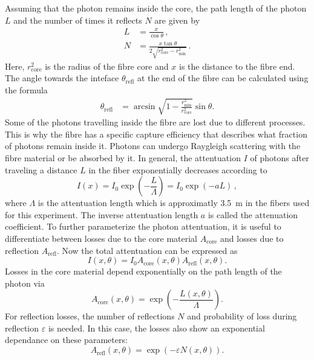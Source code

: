 Assuming that the photon remains inside the core, the path length of the photon $L$ and the number of
times it reflects $N$ are given by
\begin{align}
    L &= \frac{x}{\cos{\theta}} \, , \label{eq:L} \\ 
    N &= \frac{x \tan{\theta}}{2 \sqrt{r_\text{core}^2-r_\text{min}^2}} \, \label{eq:N} .
\end{align}
Here, $r_\text{core}^2$ is the radius of the fibre core and $x$ is the distance to the fibre end.
The angle towards the inteface $\theta_\text{refl}$ at the end of the fibre can be calculated using the formula
\begin{align*}
    \theta_\text{refl} &= \arcsin{\sqrt{1-\frac{r_\text{min}^2}{r_\text{core}^2}} \sin{\theta}} .
\end{align*}
Some of the photons travelling inside the fibre are lost due to different processes. This is why
the fibre has a specific capture efficiency that describes what fraction of photons remain inside it.
Photons can undergo Raygleigh scattering with the fibre material or be absorbed by it. In general, the attentuation $I$
of photons after traveling a distance $L$ in the fiber exponentially decreases according to
\begin{equation*}
    I(x) = I_0 \exp{\left(-\frac{L}{\Lambda}\right)} = I_0 \exp{\left(- a L \right)} \, ,
\end{equation*}
where $\Lambda$ is the attentuation length which is approximatly \qty{3.5}{\metre} in the fibers used for this experiment.
The inverse attentuation length $a$ is called the attenuation coefficient.
To further parameterize the photon attentuation, it is useful to differentiate between losses due to the core material
$A_\text{core}$ and losses due to reflection $A_\text{refl}$. Now the total attentuation can be expressed as
\begin{equation}
    I(x, \theta) = I_0 A_\text{core}(x, \theta) A_\text{refl}(x, \theta) .
    \label{eq:I}
\end{equation}
Losses in the core material depend exponentially on the path length of the photon via
\begin{equation}
    A_\text{core}(x, \theta) = \exp{\left(-\frac{L(x, \theta)}{\Lambda}\right)} .
    \label{eq:core}
\end{equation}
For reflection losses, the number of reflections $N$ and probability of loss during reflection $\varepsilon$ is needed.
In this case, the losses also show an exponential dependance on these parameters:
\begin{equation}
    A_\text{refl}(x, \theta) = \exp{\left(- \varepsilon N(x, \theta)\right)} .
    \label{eq:refl}
\end{equation}
